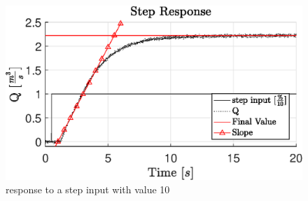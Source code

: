 \begin{figure}[H]
    \centering
    \includegraphics[width=\textwidth]{figures/04ExperimentsAndLabWork/StepResponseLabeled.eps}
    \caption{response to a step input with value 10}
	\label{fig:stepin}
\end{figure}
\\ \\ \\ \\
